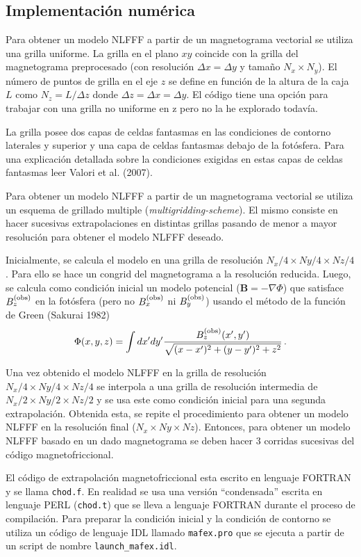 \documentclass[a4paper,10pt]{article}
\def\bB{{\boldsymbol{B}}}
\def\bxobs{B_x^{\rm (obs)}}
\def\byobs{B_y^{\rm (obs)}}
\def\bzobs{B_z^{\rm (obs)}}
\begin{document}
\subsection{Implementación numérica}
Para obtener un modelo NLFFF a partir de un magnetograma vectorial se utiliza una grilla uniforme. La grilla en el plano $xy$ coincide con la grilla del magnetograma preprocesado (con resolución $\Delta x=\Delta y$ y tamaño $N_x \times N_y$). El número de puntos de grilla en el eje $z$  se define en función de la altura de la caja $L$ como $N_z=L/\Delta z$ donde $\Delta z = \Delta x= \Delta y$. El código tiene una opción para trabajar con una grilla no uniforme en z pero no la he explorado todavía. 

La grilla posee dos capas de celdas fantasmas en las condiciones de contorno laterales y superior y una capa de celdas fantasmas debajo de la fotósfera. Para una explicación detallada sobre la condiciones exigidas en estas capas de celdas fantasmas leer Valori et al. (2007).

Para obtener un modelo NLFFF a partir de un magnetograma vectorial se utiliza un esquema de grillado multiple (\emph{multigridding-scheme}).
%
El mismo consiste en hacer sucesivas extrapolaciones en distintas grillas 
pasando de menor a mayor resolución para obtener el modelo NLFFF deseado.

Inicialmente, se calcula el modelo en una grilla de resolución $N_x/4\times Ny/4 \times Nz/4$. Para ello se hace un congrid del magnetograma a la resolución reducida. Luego, se calcula como condición inicial un modelo potencial ($\bB=-\nabla \Phi$) que satisface $\bzobs$ en la fotósfera (pero no $\bxobs$ ni $\byobs$) usando el método de la función de Green (Sakurai 1982)
\begin{equation}
 \Phi (x,y,z) = \int dx'dy'\frac{\bzobs(x',y')}{\sqrt{(x-x')^2+(y-y')^2+z^2}} \,.
\end{equation}

Una vez obtenido el modelo NLFFF en la grilla de resolución $N_x/4\times Ny/4 \times Nz/4$ se interpola a una grilla de resolución intermedia de $N_x/2\times Ny/2 \times Nz/2$ y se usa este como condición inicial para una segunda extrapolación. Obtenida esta, se repite el procedimiento para obtener un modelo NLFFF en la resolución final ($N_x\times Ny\times Nz$). Entonces, para obtener un modelo NLFFF basado en un dado magnetograma se deben hacer 3 corridas sucesivas del código magnetofriccional. 

El código de extrapolación magnetofriccional esta escrito en lenguaje FORTRAN y se llama  {\tt chod.f}. En realidad se usa una versión ``condensada'' escrita en lenguaje PERL ({\tt chod.t}) que se lleva a lenguaje FORTRAN durante el proceso de compilación. Para preparar la condición inicial y la condición de contorno se utiliza un código de lenguaje IDL llamado {\tt mafex.pro} que se ejecuta a partir de un script de nombre {\tt launch\_mafex.idl}. 
\end{document}
